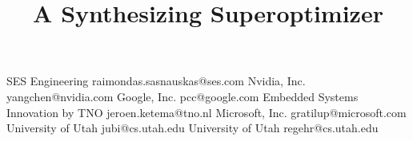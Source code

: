\documentclass[10pt,nocopyrightspace,preprint,numbers]{sigplanconf}
\begin{document}
\setlength{\pdfpageheight}{\paperheight}
\setlength{\pdfpagewidth}{\paperwidth}

\title{A Synthesizing Superoptimizer}

           {SES Engineering}
           {raimondas.sasnauskas@ses.com}
           {Nvidia, Inc.}
           {yangchen@nvidia.com}
           {Google, Inc.}
           {pcc@google.com}
           {Embedded Systems Innovation by TNO}
           {jeroen.ketema@tno.nl}
           {Microsoft, Inc.}
           {gratilup@microsoft.com}
           {University of Utah}
           {jubi@cs.utah.edu}
           {University of Utah}
           {regehr@cs.utah.edu}

\maketitle

\newcommand{\cL}{{\cal L}}
\newcommand*{\var}[1]{{\texttt{\%#1}}}
\newcommand{\tool}{Souper}

\end{document}
